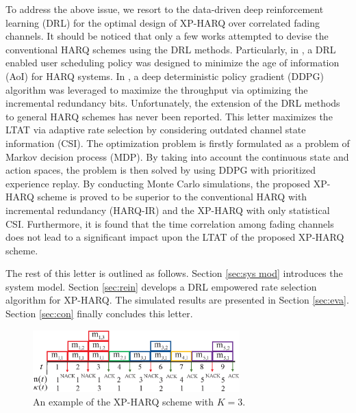 \documentclass[lettersize,journal]{IEEEtran}
\begin{document}
To address the above issue, we resort to the data-driven deep reinforcement learning (DRL) for the optimal design of XP-HARQ over correlated fading channels. It should be noticed that only a few works attempted to devise the conventional HARQ schemes using the DRL methods. Particularly, in \cite{9376717}, a DRL enabled user scheduling policy was designed to minimize the age of information (AoI) for HARQ systems. In \cite{9217354}, a deep deterministic policy gradient (DDPG) algorithm was leveraged to maximize the throughput via optimizing the incremental redundancy bits. Unfortunately, the extension of the DRL methods to general HARQ schemes has never been reported. This letter maximizes the LTAT via adaptive rate selection by considering outdated channel state information (CSI). The optimization problem is firstly formulated as a problem of Markov decision process (MDP). By taking into account the continuous state and action spaces, the problem is then solved by using DDPG with prioritized experience replay. By conducting Monte Carlo simulations, the proposed XP-HARQ scheme is proved to be superior to the conventional HARQ with incremental redundancy (HARQ-IR) and the XP-HARQ with only statistical CSI. Furthermore, it is found that the time correlation among fading channels does not lead to a significant impact upon the LTAT of the proposed XP-HARQ scheme.

The rest of this letter is outlined as follows. Section \ref{sec:sys mod} introduces the system model. Section \ref{sec:rein} develops a DRL empowered rate selection algorithm for XP-HARQ.%
The simulated results are presented %
in Section \ref{sec:eva}. Section \ref{sec:con} finally concludes this letter.
\begin{figure}[!t]
    \centering
    \includegraphics[width=8cm]{XP-HARQ_model-after.eps}
    \caption{An example of the XP-HARQ scheme with $K=3$.}
    \label{Fig.XP-HARQ model} %
\end{figure}
\end{document}
